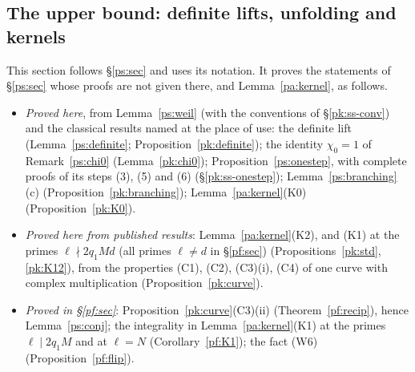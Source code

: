 \documentclass[10pt]{amsart}
\theoremstyle{definition}
\theoremstyle{remark}
\providecommand{\auAz}{\mathcal A_0}
\providecommand{\auNm}{\operatorname{Nm}}
\providecommand{\auO}{\mathcal O}
\providecommand{\auPa}{\Phi_a}
\providecommand{\auPl}{\Phi}
\providecommand{\auS}{\mathcal S}
\providecommand{\auSram}{\mathcal S^{\mathrm{ram}}}
\providecommand{\auU}{\mathrm U}
\providecommand{\aubar}[1]{\overline{#1}}
\providecommand{\aurd}{\mathrm{rd}_E}
\begin{document}
\providecommand{\auO}{\mathcal O}
\providecommand{\auU}{\mathrm U}
\providecommand{\auGL}{\mathrm{GL}}
\providecommand{\auHom}{\operatorname{Hom}}
\providecommand{\auA}{\mathbb A}
\providecommand{\auF}{\mathbb F}
\providecommand{\auPl}{\Phi}
\providecommand{\auPa}{\Phi_a}
\providecommand{\auS}{\mathcal S}
\providecommand{\auSram}{\mathcal S^{\mathrm{ram}}}
\providecommand{\auAz}{\mathcal A_0}
\providecommand{\auNm}{\operatorname{Nm}}
\providecommand{\auAut}{\operatorname{Aut}}
\providecommand{\aubar}[1]{\overline{#1}}
\providecommand{\aurd}{\mathrm{rd}_E}
\providecommand{\psM}{\mathsf M}
\providecommand{\psHS}{\mathcal H}
\providecommand{\psW}{\mathcal W}
\providecommand{\psZ}{Z}
\providecommand{\psvac}{\mathbf v}
\providecommand{\psrho}{\varrho}
\providecommand{\psE}{\mathcal E}
\providecommand{\pao}{\mathfrak o}
\providecommand{\pam}{\mathfrak m}
\providecommand{\pkI}{\mathsf I}
\providecommand{\pkm}{\mathsf m}
\providecommand{\pkev}{\operatorname{ev}}
\providecommand{\pktr}{\operatorname{tr}}
\providecommand{\pkLW}{\mathrm{LW}}

\subsection{The upper bound: definite lifts, unfolding and kernels}\label{pk:sec}

This section follows \S\ref{ps:sec} and uses its notation. It proves the statements of \S\ref{ps:sec}
whose proofs are not given there, and Lemma~\ref{pa:kernel}, as follows.
\begin{itemize}
\item \emph{Proved here}, from Lemma~\ref{ps:weil} (with the conventions of
\S\ref{pk:ss-conv}) and the classical results named at the place of use: the definite lift
(Lemma~\ref{ps:definite}; Proposition~\ref{pk:definite}); the identity $\chi_0=1$ of
Remark~\ref{ps:chi0} (Lemma~\ref{pk:chi0}); Proposition~\ref{ps:onestep}, with complete proofs of
its steps (3), (5) and (6) (\S\ref{pk:ss-onestep}); Lemma~\ref{ps:branching}(c)
(Proposition~\ref{pk:branching}); Lemma~\ref{pa:kernel}(K0) (Proposition~\ref{pk:K0}).
\item \emph{Proved here from published results}: Lemma~\ref{pa:kernel}(K2), and (K1) at the
primes $\ell\nmid2q_1Md$ (all primes $\ell\ne d$ in \S\ref{pf:sec}) (Propositions~\ref{pk:std}, \ref{pk:K12}), from the properties (C1), (C2),
(C3)(i), (C4) of one curve with complex multiplication (Proposition~\ref{pk:curve}).
\item \emph{Proved in \S\ref{pf:sec}}: Proposition~\ref{pk:curve}(C3)(ii) (Theorem~\ref{pf:recip}), hence
Lemma~\ref{ps:conj}; the integrality in Lemma~\ref{pa:kernel}(K1) at the primes $\ell\mid2q_1M$ and at
$\ell=N$ (Corollary~\ref{pf:K1}); the fact (W6) (Proposition~\ref{pf:flip}).
\end{itemize}
\end{document}
